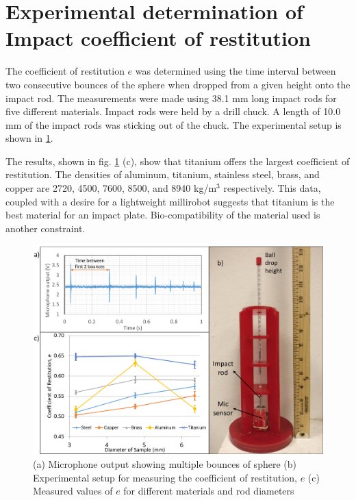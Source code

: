 \documentclass[letterpaper, 10 pt, conference]{ieeeconf}  %
\begin{document}
\section{Experimental determination of Impact coefficient of restitution}
\label{cor_det}
The coefficient of restitution $e$ was determined using the time interval between two consecutive bounces of the sphere when dropped from a given height onto the impact rod. The measurements were made using 38.1 mm long impact rods for five different materials. Impact rods were held by a drill chuck. A length of 10.0 mm of the impact rods was sticking out of the chuck. The experimental setup is shown in \cref{CoR_setup_data}.

The results, shown in fig. \ref{CoR_setup_data} (c), show that titanium offers the largest coefficient of restitution. The densities of aluminum, titanium, stainless steel, brass, and copper are 2720, 4500, 7600, 8500, and 8940 kg/m$^3$ respectively. This data, coupled with a desire for a lightweight millirobot suggests that titanium is the best material for an impact plate. Bio-compatibility of the material used is another constraint.

\begin{figure}
	\includegraphics[width=\columnwidth]{CoR_setup_data.pdf}
	\caption{(a) Microphone output showing multiple bounces of sphere (b) Experimental setup for measuring the coefficient of restitution, $e$ (c) Measured values of $e$ for different materials and rod diameters}
	\label{CoR_setup_data}
	\vspace{-1.5em}
\end{figure}
\end{document}
